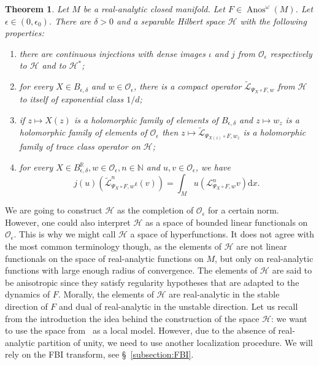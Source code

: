 \documentclass[10pt]{amsart}
\newtheorem{theo}{Theorem}[section]
\theoremstyle{definition}\newtheorem{defi}[theo]{Definition}\newtheorem{rema}[theo]{Remark}\newtheorem{exam}[theo]{Example}\newtheorem{exem}[theo]{Example}\newtheorem{nota}[theo]{Notation}
\DeclareMathOperator{\Anos}{Anos}
\newcommand{\p}[1]{\left(#1\right)}
\newcommand{\clO}{\mathcal{O}}
\newcommand{\clL}{\mathcal{L}}
\newcommand{\clH}{\mathcal{H}}
\newcommand{\bbN}{\mathbb{N}}
\newcommand{\bbR}{\mathbb{R}}
\newcommand{\rmd}{\mathrm{d}}
\newcommand*{\romanenumi}{\renewcommand*{\theenumi}{\roman{enumi}}}
\begin{document}
\begin{theo}\label{theorem:anisotropic_space}
Let $M$ be a real-analytic closed manifold. Let $F \in \Anos^\omega(M)$. Let $\epsilon \in (0,\epsilon_0)$. There are $\delta > 0$ and a separable Hilbert space $\clH$ with the following properties:
\begin{enumerate}\romanenumi
\item\label{item:injections} there are continuous injections with dense images $\iota$ and $j$ from $\clO_\epsilon$ respectively to $\clH$ and to $\clH^*$; 
\item\label{item:extension_operator} for every $X \in B_{\epsilon,\delta}$ and $w \in \clO_\epsilon$, there is a compact operator $\widetilde{\clL}_{\Psi_X \circ F,w}$ from $\clH$ to itself of exponential class $1/d$; 
\item\label{item:holomorphic_family} if $z \mapsto X(z)$ is a holomorphic family of elements of $B_{\epsilon,\delta}$ and $z \mapsto w_z$ is a holomorphic family of elements of $\clO_\epsilon$ then $z \mapsto \widetilde{\clL}_{\Psi_{X(z)} \circ F,w_z}$ is a holomorphic family of trace class operator on $\clH$; 
\item\label{item:integrals} for every $X \in B_{\epsilon,\delta}^{\bbR}, w \in \clO_\epsilon, n \in \bbN$ and $u,v \in \clO_\epsilon$, we have
\begin{equation*}
j(u)\p{\widetilde{\clL}^n_{\Psi_X \circ F,w} \iota(v)} = \int_M u \p{\clL_{\Psi_X \circ F,w}^n v} \rmd x.
\end{equation*}
\end{enumerate}
\end{theo}

We are going to construct $\clH$ as the completion of $\clO_\epsilon$ for a certain norm. However, one could also interpret $\clH$ as a space of bounded linear functionals on $\clO_\epsilon$. This is why we might call $\clH$ a space of hyperfunctions. It does not agree with the most common terminology though, as the elements of $\clH$ are not linear functionals on the space of real-analytic functions on $M$, but only on real-analytic functions with large enough radius of convergence. The elements of $\clH$ are said to be anisotropic since they satisfy regularity hypotheses that are adapted to the dynamics of $F$. Morally, the elements of $\clH$ are real-analytic in the stable direction of $F$ and dual of real-analytic in the unstable direction. Let us recall from the introduction the idea behind the construction of the space $\clH$: we want to use the space from~\cite{faure_roy} as a local model. However, due to the absence of real-analytic partition of unity, we need to use another localization procedure. We will rely on the FBI transform, see \S~\ref{subsection:FBI}.
\end{document}
